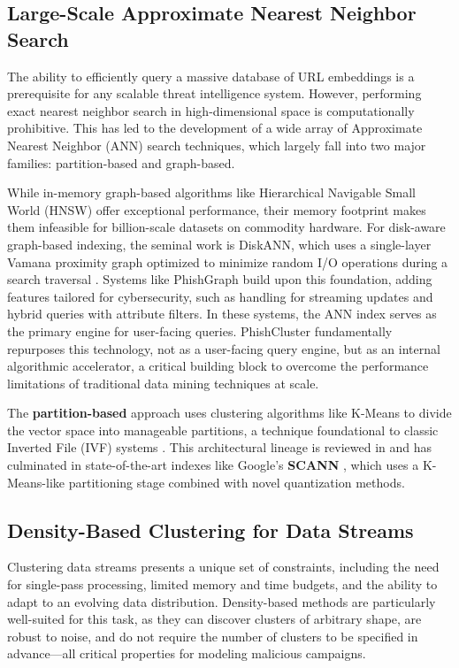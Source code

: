 \documentclass[journal,article,submit,pdftex,moreauthors]{Definitions/mdpi}
\begin{document}
\subsection{Large-Scale Approximate Nearest Neighbor Search}

The ability to efficiently query a massive database of URL embeddings is a prerequisite for any scalable threat intelligence system. However, performing exact nearest neighbor search in high-dimensional space is computationally prohibitive. This has led to the development of a wide array of Approximate Nearest Neighbor (ANN) search techniques, which largely fall into two major families: partition-based and graph-based.

While in-memory graph-based algorithms like Hierarchical Navigable Small World (HNSW)  \cite{ref_malkov} offer exceptional performance, their memory footprint makes them infeasible for billion-scale datasets on commodity hardware. For disk-aware graph-based indexing, the seminal work is DiskANN, which uses a single-layer Vamana proximity graph optimized to minimize random I/O operations during a search traversal \cite{ref_subramanya}. Systems like PhishGraph \cite{ref_phishgraph_mdpi} build upon this foundation, adding features tailored for cybersecurity, such as handling for streaming updates and hybrid queries with attribute filters. In these systems, the ANN index serves as the primary engine for user-facing queries. PhishCluster fundamentally repurposes this technology, not as a user-facing query engine, but as an internal algorithmic accelerator, a critical building block to overcome the performance limitations of traditional data mining techniques at scale.

The \textbf{partition-based} approach uses clustering algorithms like K-Means to divide the vector space into manageable partitions, a technique foundational to classic Inverted File (IVF) systems \cite{ref_jegou}. This architectural lineage is reviewed in \cite{ref_entity_resolution_kmeans} and has culminated in state-of-the-art indexes like Google's \textbf{SCANN} \cite{ref_guo}, which uses a K-Means-like partitioning stage combined with novel quantization methods.



\subsection{Density-Based Clustering for Data Streams}

Clustering data streams presents a unique set of constraints, including the need for single-pass processing, limited memory and time budgets, and the ability to adapt to an evolving data distribution. Density-based methods are particularly well-suited for this task, as they can discover clusters of arbitrary shape, are robust to noise, and do not require the number of clusters to be specified in advance—all critical properties for modeling malicious campaigns.
\end{document}
